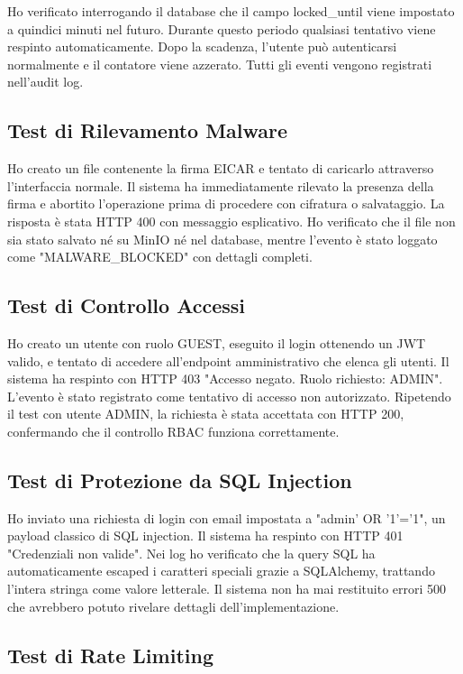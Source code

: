 \documentclass[12pt, a4paper]{article}
\begin{document}
Ho verificato interrogando il database che il campo locked\_until viene impostato a quindici minuti nel futuro. Durante questo periodo qualsiasi tentativo viene respinto automaticamente. Dopo la scadenza, l'utente può autenticarsi normalmente e il contatore viene azzerato. Tutti gli eventi vengono registrati nell'audit log.

\subsection{Test di Rilevamento Malware}

Ho creato un file contenente la firma EICAR e tentato di caricarlo attraverso l'interfaccia normale. Il sistema ha immediatamente rilevato la presenza della firma e abortito l'operazione prima di procedere con cifratura o salvataggio. La risposta è stata HTTP 400 con messaggio esplicativo. Ho verificato che il file non sia stato salvato né su MinIO né nel database, mentre l'evento è stato loggato come "MALWARE\_BLOCKED" con dettagli completi.

\subsection{Test di Controllo Accessi}

Ho creato un utente con ruolo GUEST, eseguito il login ottenendo un JWT valido, e tentato di accedere all'endpoint amministrativo che elenca gli utenti. Il sistema ha respinto con HTTP 403 "Accesso negato. Ruolo richiesto: ADMIN". L'evento è stato registrato come tentativo di accesso non autorizzato. Ripetendo il test con utente ADMIN, la richiesta è stata accettata con HTTP 200, confermando che il controllo RBAC funziona correttamente.

\subsection{Test di Protezione da SQL Injection}

Ho inviato una richiesta di login con email impostata a "admin' OR '1'='1", un payload classico di SQL injection. Il sistema ha respinto con HTTP 401 "Credenziali non valide". Nei log ho verificato che la query SQL ha automaticamente escaped i caratteri speciali grazie a SQLAlchemy, trattando l'intera stringa come valore letterale. Il sistema non ha mai restituito errori 500 che avrebbero potuto rivelare dettagli dell'implementazione.

\subsection{Test di Rate Limiting}
\end{document}
